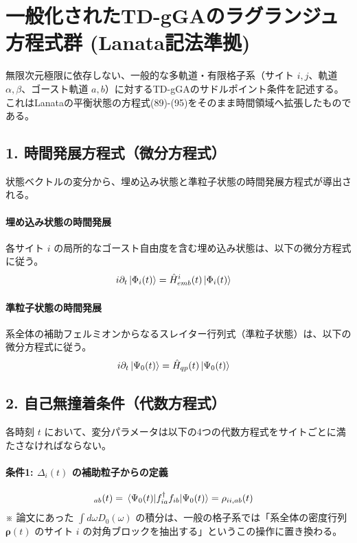 \documentclass[a4paper,11pt]{ltjarticle}
\begin{document}
\section{一般化されたTD-gGAのラグランジュ方程式群 (Lanata記法準拠)}
無限次元極限に依存しない、一般的な多軌道・有限格子系（サイト $i, j$、軌道 $\alpha, \beta$、ゴースト軌道 $a, b$）に対するTD-gGAのサドルポイント条件を記述する。これはLanataの平衡状態の方程式(89)-(95)をそのまま時間領域へ拡張したものである。

\subsection{1. 時間発展方程式（微分方程式）}
状態ベクトルの変分から、埋め込み状態と準粒子状態の時間発展方程式が導出される。

\paragraph{埋め込み状態の時間発展}
各サイト $i$ の局所的なゴースト自由度を含む埋め込み状態は、以下の微分方程式に従う。
\begin{align}
    i\partial_t \ket{\Phi_i(t)} &= \hat{H}_{emb}^i(t) \ket{\Phi_i(t)} \label{eq:td_phi_pure}
\end{align}

\paragraph{準粒子状態の時間発展}
系全体の補助フェルミオンからなるスレイター行列式（準粒子状態）は、以下の微分方程式に従う。
\begin{align}
    i\partial_t \ket{\Psi_0(t)} &= \hat{H}_{qp}(t) \ket{\Psi_0(t)} \label{eq:td_psi_pure}
\end{align}

\subsection{2. 自己無撞着条件（代数方程式）}
各時刻 $t$ において、変分パラメータは以下の4つの代数方程式をサイトごとに満たさなければならない。

\paragraph{条件1: $\Delta_i(t)$ の補助粒子からの定義}
\begin{align}
    [\Delta_i]_{ab}(t) &= \mel{\Psi_0(t)}{f_{ia}^\dagger f_{ib}}{\Psi_0(t)} = \rho_{ii, ab}(t) \label{eq:td_delta_psi}
\end{align}
※ 論文にあった $\int d\omega D_0(\omega)$ の積分は、一般の格子系では「系全体の密度行列 $\bm{\rho}(t)$ のサイト $i$ の対角ブロックを抽出する」というこの操作に置き換わる。
\end{document}

